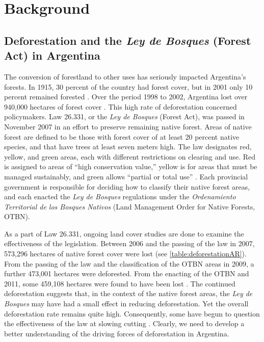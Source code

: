 \chapter{Background}
\label{background}
\section{Deforestation and the \textit{Ley de Bosques} (Forest Act) in Argentina}

The conversion of forestland to other uses has seriously impacted Argentina’s forests. In 1915, 30 percent of the country had forest cover, but in 2001 only 10 percent remained forested \autocite{secretaria-de-d2001primer}. Over the period 1998 to 2002, Argentina lost over 940,000 hectares of forest cover \autocite{secretaria-de-a2007informe}. This high rate of deforestation concerned policymakers. Law 26.331, or the \textit{Ley de Bosques} (Forest Act), was passed in November 2007 in an effort to preserve remaining native forest. Areas of native forest are defined to be those with forest cover of at least 20 percent native species, and that have trees at least seven meters high. The law designates red, yellow, and green areas, each with different restrictions on clearing and use. Red is assigned to areas of ``high conservation value,'' yellow is for areas that must be managed sustainably, and green allows ``partial or total use'' \autocite[25]{gulezian2009environmental}. Each provincial government is responsible for deciding how to classify their native forest areas, and each enacted the \textit{Ley de Bosques} regulations under the \textit{Ordenamiento Territorial de los Bosques Nativos} (Land Management Order for Native Forests, OTBN).

As a part of Law 26.331, ongoing land cover studies are done to examine the effectiveness of the legislation. Between 2006 and the passing of the law in 2007, 573,296 hectares of native forest cover were lost (see \cref{table:deforestationAR}). From the passing of the law and the classification of the OTBN areas in 2009, a further 473,001 hectares were deforested. From the enacting of the OTBN and 2011, some 459,108 hectares were found to have been lost \autocite{secreteria-de-a2012monitoreo}. The continued deforestation suggests that, in the context of the native forest areas, the \textit{Ley de Bosques} may have had a small effect in reducing deforestation. Yet the overall deforestation rate remains quite high. Consequently, some have begun to question the effectiveness of the law at slowing cutting \autocites{valpreda2012the-protection}{greenpeace-arge2013ley-de-bosques:}. Clearly, we need to develop a better understanding of the driving forces of deforestation in Argentina.

